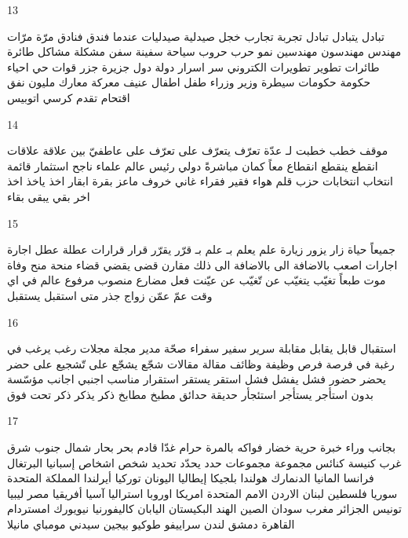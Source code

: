 \documentclass[twocolumn,a4paper]{article}
\begin{document}
13

\textarabic{ تبادل  يتبادل  
 تبادل  
 تجربة  تجارب  
 خجل  
 صيدلية  صيدليات
 عندما  
 فندق  فنادق  
 مرّة  مرّات
 مهندس  مهندسون
  مهندسين
  نمو  
 حرب  حروب  
 سياحة  
 سفينة  سفن  
 مشكلة  مشاكل  
 طائرة  طائرات
 تطوير  تطويرات
 الكتروني  
  سر  اسرار  
 دولة  دول  
 جزيرة  جزر  
 قوات  
 حي  احياء  
 حكومة  حكومات
 سيطرة  
 وزير  وزراء  
 طفل  اطفال  
 عنيف  
 معركة  معارك  
 مليون  
 نفق  
 اقتحام  
 تقدم  
 كرسي  
 اتوبيس  
}

14

\textarabic{ موقف  
 خطب  خطبت لـ  
 عدّة  
 تعرّف  يتعرّف على  
 تعرّف على  
 عاطفيّ  
 بين  
 علاقة  علاقات
 انقطع  ينقطع  
 انقطاع  
 معاً  
 كمان  
 مباشرةً  
 دولي  
 رئيس  
 عالم  علماء  
 ناجح  
 استثمار  
 قائمة  
 انتخاب  انتخابات
 حزب  
 قلم  
 هواء  
 فقير  فقراء   
 غاني  
 خروف  
 ماعز  
 بقرة  ابقار  
 اخذ  ياخذ  
 اخذ  
 اخر  
 بقي  يبقى  
 بقاء  
}

15

\textarabic{ جميعاً  
 حياة  
 زار  يزور  
 زيارة  
 علم  يعلم بـ  
 علم بـ  
 قرّر  يقرّر  
 قرار  قرارات
 عطلة  عطل  
 اجارة  اجارات
 اصعب  
 باﻻضافة الى  
 باﻻضافة الى ذلك  
 مقارن  
 قضى  يقضي  
 قضاء  
 منحة  منح  
 وفاة  
 موت  
 طبعاً  
 تغيّب  يتغيّب عن  
 تّغيّب عن  
 عيّنت  
 فعل مضارع  
 منصوب  
 مرفوع  
 عالم  
 في اي وقت  
 عمّ  
 عمّن 
 زواج  
 جذر  
 متى  
 استقبل  يستقبل  
}

16

\textarabic{ استقبال  
 قابل  يقابل  
 مقابلة  
 سرير  
 سفير  سفراء  
 صحّة  
 مدير  
 مجلة  مجلات
 رغب  يرغب في  
 رغبة في  
 فرصة  فرص  
 وظيفة  وظائف  
 مقالة  مقالات
 شجّع  يشجّع على  
 تّشجيع على  
 حضر  يحضر  
 حضور  
 فشل  يفشل  
 فشل  
 استقر  يستقر  
 استقرار  
 مناسب  
 اجنبي  اجانب  
 مؤسّسة  
 بدون  
 استأجر  يستأجر  
 استئجأر  
 حديقة  حدائق  
 مطبخ  مطابخ  
 ذكر  يذكر  
 ذكر  
 تحت  
 فوق  
}

17

\textarabic{ بجانب  
 وراء  
 خبرة  
 حرية  
 خضار  
 فواكه  
 بالمرة  
 حرام  
 غدّا  
 قادم  
 بحر  بحار  
 شمال  
 جنوب  
 شرق  
 غرب  
 كنيسة  كنائس  
 مجموعة  مجموعات
 حدد  يحدّد  
 تحديد  
 شخص  اشخاص  
}\clearpage
\textarabic{
 إسبانيا  
 البرتغال  
 فرانسا  
 المانيا  
  الدنمارك 
 هولندا  
 بلجيكا  
 إيطاليا  
 اليونان  
 توركيا  
 أيرلندا  
 المملكة المتحدة 
 سوريا  
 فلسطين  
 لبنان  
 الاردن  
 اﻻمم المتحدة  
 امريكا  
 اوروبا  
 استراليا  
 آسيا  
 أفريقيا  
 مصر  
 ليبيا  
 تونيس  
 الجزائر  
 مغرب  
 سودان  
 الصين  
 الهند  
 البكيستان  
 اليابان  
 كاليفورنيا  
 نيويورك  
 امستردام  
 القاهرة  
 دمشق  
 لندن  
 سراييفو  
 طوكيو  
 بيجين  
 سيدني  
 مومباي  
 مانيلا  
}
\end{document}
